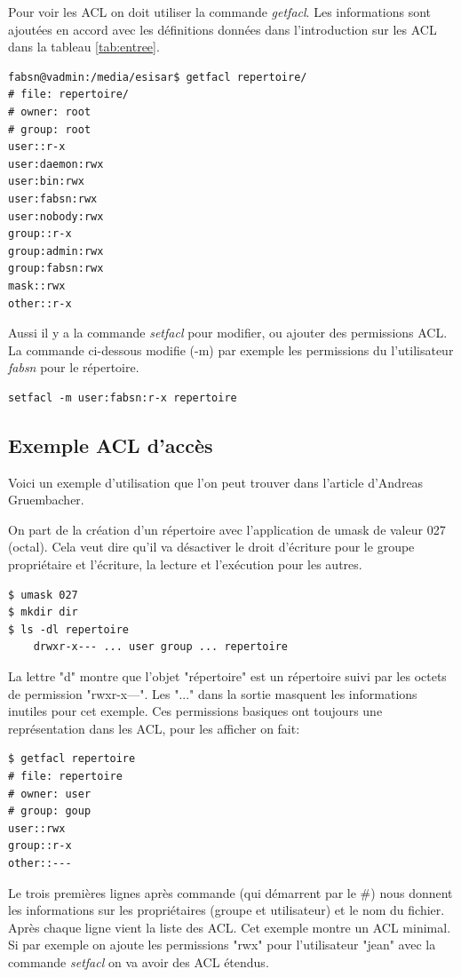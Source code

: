 \documentclass{article}
\begin{document}
Pour voir les ACL on doit utiliser la commande \emph{getfacl}. Les informations sont ajoutées en accord avec les définitions données dans l'introduction sur les ACL dans la tableau \ref{tab:entree}. 

\begin{verbatim}
fabsn@vadmin:/media/esisar$ getfacl repertoire/
# file: repertoire/
# owner: root
# group: root
user::r-x
user:daemon:rwx
user:bin:rwx
user:fabsn:rwx
user:nobody:rwx
group::r-x
group:admin:rwx
group:fabsn:rwx
mask::rwx
other::r-x	
\end{verbatim}

Aussi il y a la commande \emph{setfacl} pour modifier, ou ajouter des permissions ACL. La commande ci-dessous modifie (-m) par exemple les permissions du l'utilisateur \emph{fabsn} pour le répertoire. 

\begin{verbatim}
setfacl -m user:fabsn:r-x repertoire
\end{verbatim}


\subsection{Exemple ACL d'accès}

Voici un exemple d'utilisation que l'on peut trouver dans l'article d'Andreas Gruembacher\cite{aclsuse}.

On part de la création d'un répertoire avec l'application de umask de valeur 027 (octal). Cela veut dire qu'il va désactiver le droit d'écriture pour le groupe propriétaire et l'écriture, la lecture et l'exécution pour les autres.

\begin{verbatim}
$ umask 027 
$ mkdir dir 
$ ls -dl repertoire
	drwxr-x--- ... user group ... repertoire
\end{verbatim}

La lettre "d" montre que l'objet "répertoire" est un répertoire suivi par les octets de permission "rwxr-x---". Les "..." dans la sortie masquent les informations inutiles pour cet exemple. Ces permissions basiques ont toujours une représentation dans les ACL, pour les afficher on fait:

\begin{verbatim}
$ getfacl repertoire
# file: repertoire 
# owner: user 
# group: goup
user::rwx
group::r-x
other::---
\end{verbatim}

Le trois premières lignes après commande (qui démarrent par le \#) nous donnent les informations sur les propriétaires (groupe et utilisateur) et le nom du fichier. Après chaque ligne vient la liste des ACL. Cet exemple montre un ACL minimal. Si par exemple on ajoute les permissions "rwx" pour l'utilisateur "jean" avec la commande \emph{setfacl} on va avoir des ACL étendus.
\end{document}
